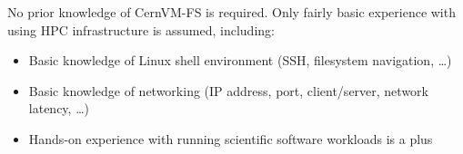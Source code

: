 No prior knowledge of CernVM-FS is required.
Only fairly basic experience with using HPC infrastructure is assumed, including:

\begin{itemize}
\item Basic knowledge of Linux shell environment (SSH, filesystem navigation, \ldots)
\item Basic knowledge of networking (IP address, port, client/server, network latency, \ldots)
\item Hands-on experience with running scientific software workloads is a plus
\end{itemize}


